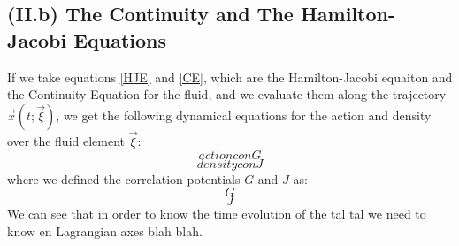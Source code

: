 \documentclass[11pt, a4paper]{article} %
\begin{document}
\subsection*{(II.b) The Continuity and The Hamilton-Jacobi Equations}

If we take equations \eqref{HJE} and \eqref{CE}, which are the Hamilton-Jacobi equaiton and the Continuity Equation for the fluid, and we evaluate them along the trajectory $\vec{x}(t;\vec{\xi})$, we get the following dynamical equations for the action and density over the fluid element $\vec{\xi}$:
\begin{equation}
action con G
\end{equation}
\begin{equation}
density con J
\end{equation}
where we defined the correlation potentials $G$ and $J$ as:
\begin{equation}\label{GL}
G
\end{equation}
\begin{equation}\label{JL}
J
\end{equation}
We can see that in order to know the time evolution of the tal tal we need to know en Lagrangian axes blah blah.
\end{document}
